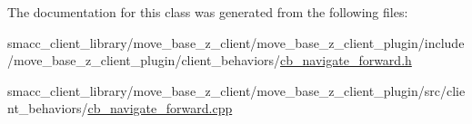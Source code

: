 The documentation for this class was generated from the following files\+:\begin{DoxyCompactItemize}
\item 
smacc\+\_\+client\+\_\+library/move\+\_\+base\+\_\+z\+\_\+client/move\+\_\+base\+\_\+z\+\_\+client\+\_\+plugin/include/move\+\_\+base\+\_\+z\+\_\+client\+\_\+plugin/client\+\_\+behaviors/\hyperlink{cb__navigate__forward_8h}{cb\+\_\+navigate\+\_\+forward.\+h}\item 
smacc\+\_\+client\+\_\+library/move\+\_\+base\+\_\+z\+\_\+client/move\+\_\+base\+\_\+z\+\_\+client\+\_\+plugin/src/client\+\_\+behaviors/\hyperlink{cb__navigate__forward_8cpp}{cb\+\_\+navigate\+\_\+forward.\+cpp}\end{DoxyCompactItemize}

